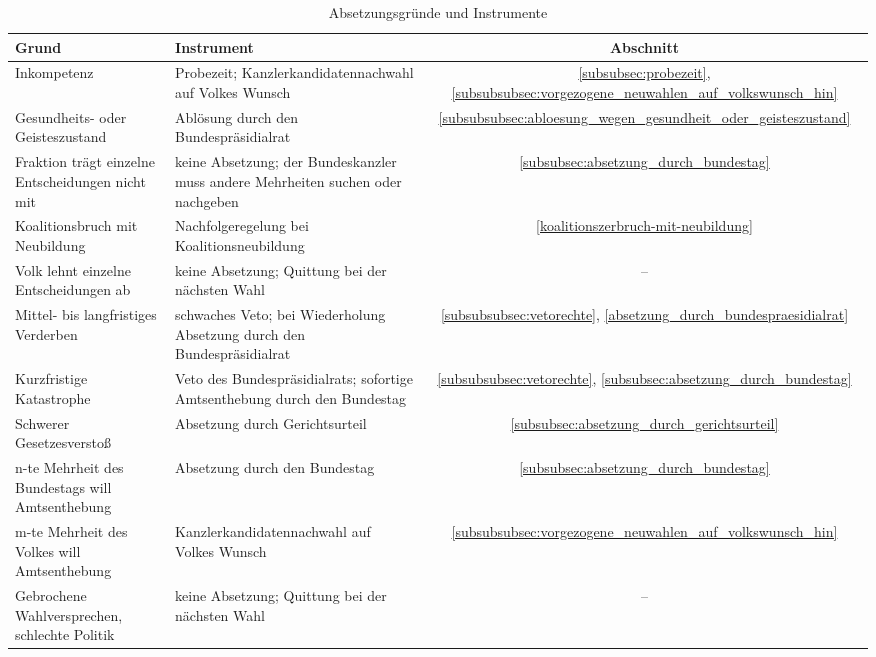 \begin{table}[H]
\renewcommand{\arraystretch}{1.4}%
\begin{tabularx}{\linewidth}{| >{\raggedright\arraybackslash}X | >{\raggedright\arraybackslash}X | c |}
  \hline
  \textbf{Grund} & \textbf{Instrument} & \textbf{Abschnitt} \\
  \hline
  Inkompetenz & Probezeit; Kanzlerkandidatennachwahl auf Volkes Wunsch & \ref{subsubsec:probezeit}, \ref{subsubsubsec:vorgezogene_neuwahlen_auf_volkswunsch_hin} \\
  \hline
  Gesundheits- oder Geisteszustand & Ablösung durch den Bundespräsidialrat & \ref{subsubsubsec:abloesung_wegen_gesundheit_oder_geisteszustand} \\
  \hline
  Fraktion trägt einzelne Entscheidungen nicht mit & keine Absetzung; der Bundeskanzler muss andere Mehrheiten suchen oder nachgeben & \ref{subsubsec:absetzung_durch_bundestag} \\
  \hline
  Koalitionsbruch mit Neubildung & Nachfolgeregelung bei Koalitionsneubildung & \ref{koalitionszerbruch-mit-neubildung} \\
  \hline
  Volk lehnt einzelne Entscheidungen ab & keine Absetzung; Quittung bei der nächsten Wahl & -- \\
  \hline
  Mittel- bis langfristiges Verderben & schwaches Veto; bei Wiederholung Absetzung durch den Bundespräsidialrat & \ref{subsubsubsec:vetorechte}, \ref{absetzung_durch_bundespraesidialrat} \\
  \hline
  Kurzfristige Katastrophe & Veto des Bundespräsidialrats; sofortige Amtsenthebung durch den Bundestag & \ref{subsubsubsec:vetorechte}, \ref{subsubsec:absetzung_durch_bundestag} \\
  \hline
  Schwerer Gesetzesverstoß & Absetzung durch Gerichtsurteil & \ref{subsubsec:absetzung_durch_gerichtsurteil} \\
  \hline
  n-te Mehrheit des Bundestags will Amtsenthebung & Absetzung durch den Bundestag & \ref{subsubsec:absetzung_durch_bundestag} \\
  \hline
  m-te Mehrheit des Volkes will Amtsenthebung & Kanzlerkandidatennachwahl auf Volkes Wunsch & \ref{subsubsubsec:vorgezogene_neuwahlen_auf_volkswunsch_hin} \\
  \hline
  Gebrochene Wahlversprechen, schlechte Politik & keine Absetzung; Quittung bei der nächsten Wahl & -- \\
  \hline
\end{tabularx}
\caption{Absetzungsgründe und Instrumente}
\label{tab:absetzungsgruende}
\end{table}

